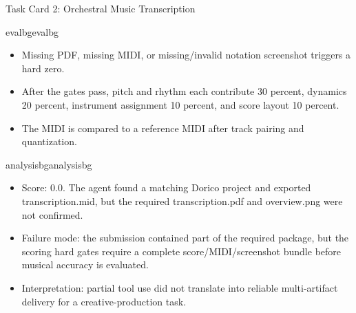 \begin{ColorTaskCard}{Task Card 2: Orchestral Music Transcription \hfill {}}
\begin{minipage}[t]{0.49\linewidth}
\end{minipage}\hfill
\begin{minipage}[t]{0.49\linewidth}
\vspace{0pt}
\begin{CardBlock}{evalbg}{evalbg}
\begin{itemize}
\item Missing PDF, missing MIDI, or missing/invalid notation screenshot triggers a hard zero.
\item After the gates pass, pitch and rhythm each contribute 30 percent, dynamics 20 percent, instrument assignment 10 percent, and score layout 10 percent.
\item The MIDI is compared to a reference MIDI after track pairing and quantization.
\end{itemize}
\end{CardBlock}

\begin{CardBlock}{analysisbg}{analysisbg}
\begin{itemize}
\item Score: 0.0. The agent found a matching Dorico project and exported transcription.mid, but the required transcription.pdf and overview.png were not confirmed.
\item Failure mode: the submission contained part of the required package, but the scoring hard gates require a complete score/MIDI/screenshot bundle before musical accuracy is evaluated.
\item Interpretation: partial tool use did not translate into reliable multi-artifact delivery for a creative-production task.
\end{itemize}
\end{CardBlock}
\end{minipage}
\end{ColorTaskCard}
\clearpage
